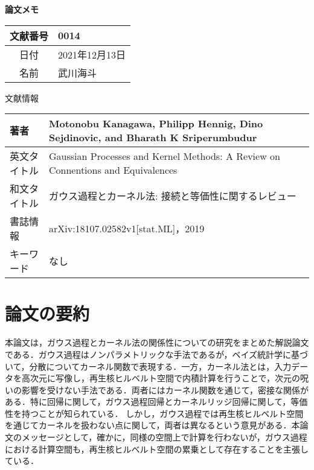 \documentclass[10pt,onecolumn]{jsarticle}
\begin{document}
\vspace{-20mm}
\begin{center}
{\LARGE\textbf{論文メモ}}
\end{center}

\begin{flushright}
\begin{tabular}{|c|l|}
\hline
文献番号  &  0014
\\
\hline
日付  &  2021年12月13日
\\
\hline
名前  &  武川海斗
\\
\hline
\end{tabular}
\end{flushright}


%
%
\begin{center}
{\large 文献情報}
\begin{table}[hbp]%
\begin{tabular}{|l||l|}
\hline
著者  &  Motonobu Kanagawa, Philipp Hennig,  Dino     Sejdinovic, and Bharath K Sriperumbudur
\\ \hline
英文タイトル  &  Gaussian Processes and Kernel Methods: A Review  on Connentions and Equivalences
\\ \hline
和文タイトル  & ガウス過程とカーネル法: 接続と等価性に関するレビュー
\\ \hline
書誌情報  &  arXiv:18107.02582v1[stat.ML]，2019
\\ \hline
キーワード & なし
\\ \hline
\end{tabular}
\end{table}
\end{center}


\section{論文の要約}
本論文は，ガウス過程とカーネル法の関係性についての研究をまとめた解説論文である．ガウス過程はノンパラメトリックな手法であるが，ベイズ統計学に基づいて，分散についてカーネル関数で表現する．一方，カーネル法とは，入力データを高次元に写像し，再生核ヒルベルト空間で内積計算を行うことで，次元の呪いの影響を受けない手法である．両者にはカーネル関数を通じて，密接な関係がある．特に回帰に関して，ガウス過程回帰とカーネルリッジ回帰に関して，等価性を持つことが知られている．
しかし，ガウス過程では再生核ヒルベルト空間を通じてカーネルを扱わない点に関して，両者は異なるという意見がある．本論文のメッセージとして，確かに，同様の空間上で計算を行わないが，ガウス過程における計算空間も，再生核ヒルベルト空間の累乗として存在することを主張している．
\end{document}
